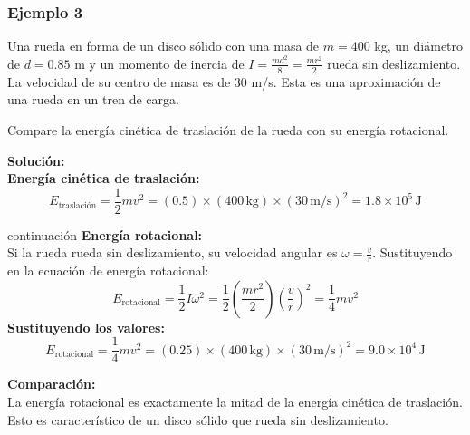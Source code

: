 \documentclass[main.tex]{subfiles}
\begin{document}
\begin{frame}[t] %
    \frametitle{Ejemplo 3}
    Una rueda en forma de un disco sólido con una masa de $m = 400$ kg, un diámetro de $d = 0.85$ m y un momento de inercia de $I = \frac{md^2}{8} = \frac{mr^2}{2}$ rueda sin deslizamiento. La velocidad de su centro de masa es de 30 m/s. Esta es una aproximación de una rueda en un tren de carga.

    Compare la energía cinética de traslación de la rueda con su energía rotacional.

    \pause %

    \textbf{Solución:} \\
    \textbf{Energía cinética de traslación:} \\
    \[
    E_{\text{traslación}} = \frac{1}{2} m v^2 = (0.5) \times (400 \, \text{kg}) \times (30 \, \text{m/s})^2 = 1.8 \times 10^5 \, \text{J}
    \]
\end{frame}
\begin{frame}{continuación}
     \textbf{Energía rotacional:} \\
    Si la rueda rueda sin deslizamiento, su velocidad angular es $\omega = \frac{v}{r}$. Sustituyendo en la ecuación de energía rotacional: \\
    \[
    E_{\text{rotacional}} = \frac{1}{2} I \omega^2 = \frac{1}{2} \left(\frac{m r^2}{2}\right) \left(\frac{v}{r}\right)^2 = \frac{1}{4} m v^2
    \]
     \textbf{Sustituyendo los valores:} \\
    \pause %
    \[
    E_{\text{rotacional}} = \frac{1}{4} m v^2 = (0.25) \times (400 \, \text{kg}) \times (30 \, \text{m/s})^2 = 9.0 \times 10^4 \, \text{J}
    \]


    \textbf{Comparación:} \\
    La energía rotacional es exactamente la mitad de la energía cinética de traslación. Esto es característico de un disco sólido que rueda sin deslizamiento.
\end{frame}

  
\end{document}
